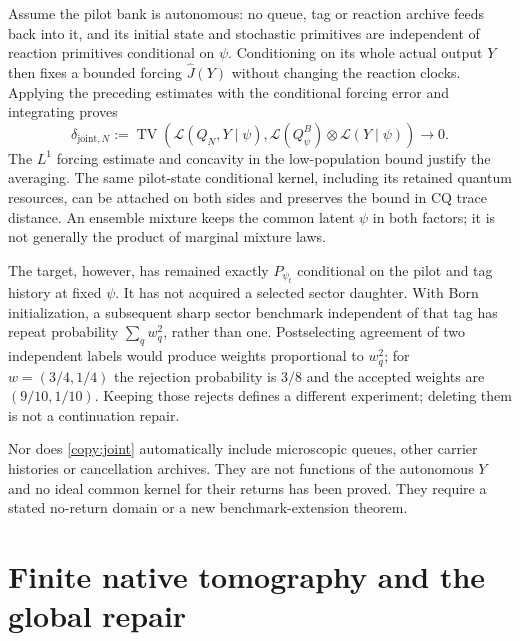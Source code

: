 \documentclass[11pt,oneside,openany]{book}
\theoremstyle{definition}
\theoremstyle{remark}\newtheorem{remark}[theorem]{Remark}
\begin{document}
Assume the pilot bank is autonomous: no queue, tag or reaction archive
feeds back into it, and its initial state and stochastic primitives
are independent of reaction primitives conditional on $\psi$.
Conditioning on its whole actual output $Y$ then fixes a bounded
forcing $\widehat J(Y)$ without changing the reaction clocks. Applying
the preceding estimates with the conditional forcing error and
integrating proves
\begin{equation}
 \delta_{\mathrm{joint},N}:=
 \operatorname{TV}\left(\mathcal L(Q_N,Y\mid\psi),
       \mathcal L(Q^B_\psi)\otimes\mathcal L(Y\mid\psi)\right)
                       \longrightarrow0.                  \label{copy:joint}
\end{equation}
The $L^1$ forcing estimate and concavity in the low-population bound
justify the averaging. The same pilot-state conditional kernel,
including its retained quantum resources, can be attached on both
sides and preserves the bound in CQ trace distance. An ensemble
mixture keeps the common latent $\psi$ in both factors; it is not
generally the product of marginal mixture laws.

The target, however, has remained exactly $P_{\psi_t}$ conditional
on the pilot and tag history at fixed $\psi$. It has not acquired a
selected sector daughter. With Born initialization, a subsequent sharp
sector benchmark independent of that tag has repeat probability
$\sum_qw_q^2$, rather than one. Postselecting agreement of two
independent labels would produce weights proportional to $w_q^2$;
for $w=(3/4,1/4)$ the rejection probability is $3/8$ and the accepted
weights are $(9/10,1/10)$. Keeping those rejects defines a different
experiment; deleting them is not a continuation repair.

Nor does \eqref{copy:joint} automatically include microscopic queues,
other carrier histories or cancellation archives. They are not
functions of the autonomous $Y$ and no ideal common kernel for their
returns has been proved. They require a stated no-return domain or a
new benchmark-extension theorem.

\section{Finite native tomography and the global repair}
\end{document}
